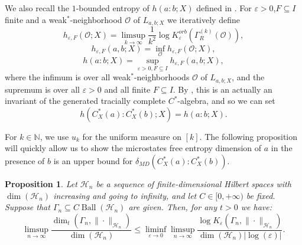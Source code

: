 \documentclass[10pt]{amsart}
\newtheorem{prop}[thm]{Proposition}
\theoremstyle{definition}
\numberwithin{equation}{section}
\newcommand{\bN}{{\mathbb N}}
\newcommand{\cH}{{\mathcal H}}
\DeclareMathOperator{\Ball}{Ball}
\begin{document}
We also recall the $1$-bounded entropy of $h(a:b;X)$ defined in \cite{macmahon20261boundedentropycalgebras}. For $\varepsilon>0$,$F\subseteq I$ finite and a weak$^{*}$-neighborhood $\mathcal{O}$ of $L_{a,b;X}$ we iteratively define
\[h_{\varepsilon,F}(\mathcal{O};X)=\limsup_{k\to\infty}\frac{1}{k^{2}}\log K_{\varepsilon}^{orb}(\Gamma^{(k)}_{R}(\mathcal{O})),\]
\[h_{\varepsilon,F}(a,b;X)=\inf_{\mathcal{O}}h_{\varepsilon,F}(\mathcal{O};X),\]
\[h(a:b;X)=\sup_{\varepsilon>0,F\subseteq I}h_{\varepsilon,F}(a,b;X),\]
where the infimum is over all weak$^{*}$-neighborhoods $\mathcal{O}$ of $L_{a,b;X}$, and the supremum is over all $\varepsilon>0$ and all finite $F\subseteq I$. By \cite{macmahon20261boundedentropycalgebras}, this is an actually an invariant of the generated tracially complete $C^{*}$-algebra, and so we can set 
\[h(C^{*}_{X}(a):C^{*}_{X}(b);X)=h(a:b;X).\]









For $k\in \bN$, we use $u_{k}$ for the uniform measure on $[k]$. The following proposition will quickly allow us to show the microstates free entropy dimension of $a$ in the presence of $b$ is an upper bound for $\delta_{MD}(C^{*}_{X}(a):C^{*}_{X}(b)).$


\begin{prop}\label{prop: width and packing dim comparison}
Let $\cH_{n}$ be a sequence of finite-dimensional Hilbert spaces with $\dim(\cH_{n})$ increasing and going to infinity, and let $C\in [0,+\infty)$ be fixed. Suppose that $\Gamma_{n}\subseteq C\Ball(\cH_{n})$ are given. Then, for any $t>0$ we have:
\[\limsup_{n\to\infty}\frac{\dim_{t}(\Gamma_{n},\|\cdot\|_{\cH_{n}})}{\dim(\cH_{n})}\leq \liminf_{\varepsilon\to 0}\limsup_{n\to\infty}\frac{\log K_{\varepsilon}(\Gamma_{n},\|\cdot\|_{\cH_{n}})}{\dim(\cH_{n})|\log(\varepsilon)|}.\]

\end{prop}
\end{document}
